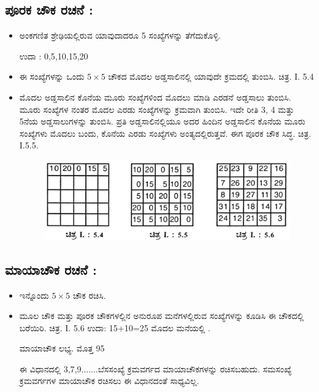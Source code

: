 \subsection*{ಪೂರಕ ಚೌಕ ರಚನೆ :}

\begin{itemize}
	\item ಅಂಕಗಣಿತ ಶ್ರೇಢಿಯಲ್ಲಿರುವ ಯಾವುದಾದರೂ 5 ಸಂಖ್ಯೆಗಳನ್ನು ತೆಗೆದುಕೊಳ್ಳಿ.

	ಉದಾ : 0,5,10,15,20
	\item ಈ ಸಂಖ್ಯೆಗಳನ್ನು ಒಂದು $5 \times 5$ ಚೌಕದ ಮೊದಲ ಅಡ್ಡಸಾಲಿನಲ್ಲಿ ಯಾವುದೇ ಕ್ರಮದಲ್ಲಿ ತುಂಬಿಸಿ. ಚಿತ್ರ. I. 5.4
	\item ಮೊದಲ ಅಡ್ಡಸಾಲಿನ ಕೊನೆಯ ಮೂರು ಸಂಖ್ಯೆಗಳಿಂದ ಮೊದಲು ಮಾಡಿ ಎರಡನೆ ಅಡ್ಡಸಾಲು ತುಂಬಿಸಿ. ಮೂರು ಸಂಖ್ಯೆಗಳ ನಂತರ ಮೊದಲ ಎರಡು ಸಂಖ್ಯೆಗಳನ್ನು ಕ್ರಮವಾಗಿ ತುಂಬಿಸಿ. ಇದೇ ರೀತಿ 3, 4 ಮತ್ತು 5ನೆಯ ಅಡ್ಡಸಾಲುಗಳನ್ನು ತುಂಬಿಸಿ. ಪ್ರತಿ ಅಡ್ಡಸಾಲಿನಲ್ಲಿಯೂ ಅದರ ಹಿಂದಿನ ಅಡ್ಡಸಾಲಿನ ಕೊನೆಯ ಮೂರು ಸಂಖ್ಯೆಗಳು ಮೊದಲು ಬಂದು, ಕೊನೆಯ ಎರಡು ಸಂಖ್ಯೆಗಳು ಅಂತ್ಯದಲ್ಲಿರುತ್ತವೆ. ಈಗ ಪೂರಕ ಚೌಕ ಸಿದ್ಧ. ಚಿತ್ರ. I.5.5.
	\begin{figure}[h]
	\includegraphics{src/figures/chap3/fig3.12.jpg}
	\end{figure}
\end{itemize}

\newpage

\subsection*{ಮಾಯಾಚೌಕ ರಚನೆ :}

\begin{itemize}
	\item ಇನ್ನೊಂದು $5 \times 5$ ಚೌಕ ರಚಿಸಿ.
	\item ಮೂಲ ಚೌಕ ಮತ್ತು ಪೂರಕ ಚೌಕಗಳಲ್ಲಿನ ಅನುರೂಪ ಮನೆಗಳಲ್ಲಿರುವ ಸಂಖ್ಯೆ\-ಗಳನ್ನು ಕೂಡಿಸಿ ಈ ಚೌಕದಲ್ಲಿ ಬರೆಯಿರಿ. ಚಿತ್ರ. I. 5.6
	ಉದಾ: 15+10=25 ಮೊದಲ ಮನೆಯಲ್ಲಿ .

	ಮಾಯಾಚೌಕ ಲಭ್ಯ. ಮೊತ್ತ 95

	ಈ ವಿಧಾನದಲ್ಲಿ 3,7,9.......ಬೆಸಸಂಖ್ಯೆ ಕ್ರಮವರ್ಗದ ಮಾಯಾಚೌಕಗಳನ್ನು ರಚಿಸ\-ಬಹುದು. ಸಮಸಂಖ್ಯೆ ಕ್ರಮವರ್ಗಗಳ ಮಾಯಾಚೌಕ ರಚಿಸಲು ಈ ವಿಧಾನದಂತೆ ಸಾಧ್ಯವಿಲ್ಲ.
\end{itemize}

